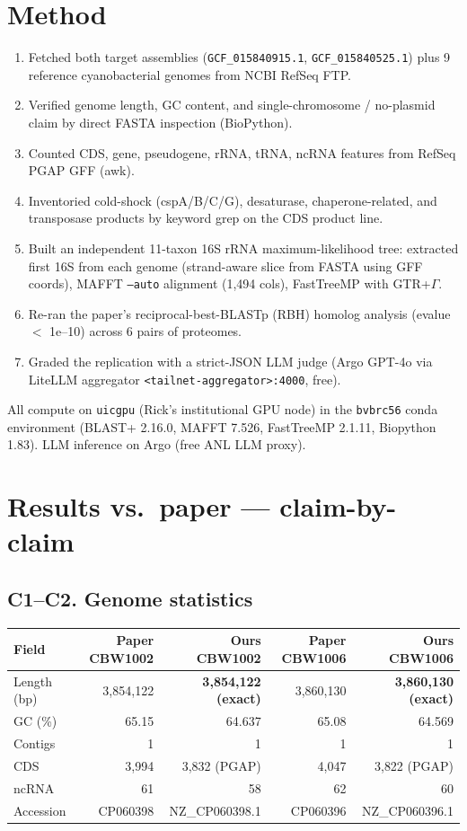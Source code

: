 \documentclass[11pt]{article}
\begin{document}
\section{Method}
\begin{enumerate}
\item Fetched both target assemblies (\texttt{GCF\_015840915.1}, \texttt{GCF\_015840525.1}) plus 9 reference cyanobacterial genomes from NCBI RefSeq FTP.
\item Verified genome length, GC content, and single-chromosome / no-plasmid claim by direct FASTA inspection (BioPython).
\item Counted CDS, gene, pseudogene, rRNA, tRNA, ncRNA features from RefSeq PGAP GFF (awk).
\item Inventoried cold-shock (cspA/B/C/G), desaturase, chaperone-related, and transposase products by keyword grep on the CDS product line.
\item Built an independent 11-taxon 16S rRNA maximum-likelihood tree: extracted first 16S from each genome (strand-aware slice from FASTA using GFF coords), MAFFT \texttt{--auto} alignment (1{,}494 cols), FastTreeMP with GTR+$\Gamma$.
\item Re-ran the paper's reciprocal-best-BLASTp (RBH) homolog analysis (evalue $<$ 1e--10) across 6 pairs of proteomes.
\item Graded the replication with a strict-JSON LLM judge (Argo GPT-4o via LiteLLM aggregator \texttt{<tailnet-aggregator>:4000}, free).
\end{enumerate}
All compute on \texttt{uicgpu} (Rick's institutional GPU node) in the \texttt{bvbrc56} conda environment (BLAST+ 2.16.0, MAFFT 7.526, FastTreeMP 2.1.11, Biopython 1.83). LLM inference on Argo (free ANL LLM proxy).

\section{Results vs.\ paper --- claim-by-claim}

\subsection{C1--C2. Genome statistics}
\begin{center}
\begin{tabular}{lrrrr}
\toprule
Field & Paper CBW1002 & Ours CBW1002 & Paper CBW1006 & Ours CBW1006 \\ \midrule
Length (bp) & 3{,}854{,}122 & \textbf{3{,}854{,}122 (exact)} & 3{,}860{,}130 & \textbf{3{,}860{,}130 (exact)} \\
GC (\%) & 65.15 & 64.637 & 65.08 & 64.569 \\
Contigs & 1 & 1 & 1 & 1 \\
CDS & 3{,}994 & 3{,}832 (PGAP) & 4{,}047 & 3{,}822 (PGAP) \\
ncRNA & 61 & 58 & 62 & 60 \\
Accession & CP060398 & NZ\_CP060398.1 & CP060396 & NZ\_CP060396.1 \\ \bottomrule
\end{tabular}
\end{center}
\end{document}
